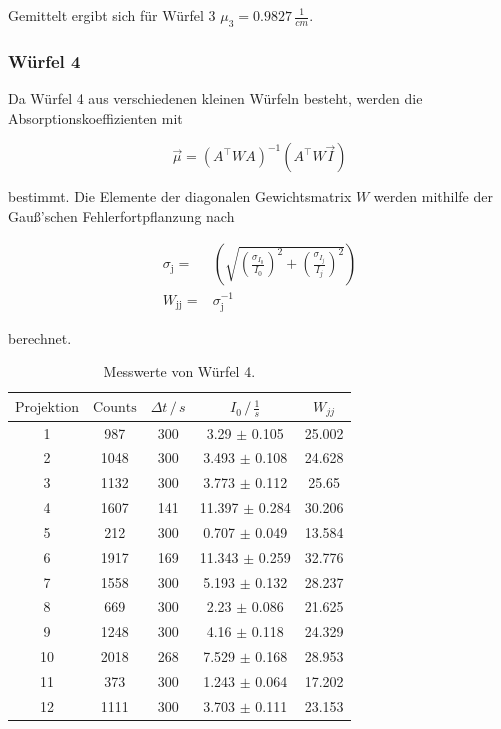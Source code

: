 \noindent
Gemittelt ergibt sich für Würfel 3 $\mu_3 = 0.9827 \, \frac{1}{cm}$.

\subsubsection{Würfel 4}




    \noindent
    Da Würfel 4 aus verschiedenen kleinen Würfeln besteht, werden die Absorptionskoeffizienten mit
  
  \begin{equation}
  \vec{\mu} = ( A^\top W A)^{-1}(A^\top W \vec{I})
  \label{eqn:mu4}
  \end{equation}
  
  \noindent
  bestimmt.
  Die Elemente der diagonalen Gewichtsmatrix $W$ werden mithilfe der Gauß'schen Fehlerfortpflanzung nach
  
    \begin{align*}
        \sigma_{\text{j}}=& \left(\sqrt{\left(\frac{\sigma_{I_0}}{I_0}\right)^2+ \left(\frac{\sigma_{I_j}}{I_j}\right)^2}\right)\\
        W_{\text{jj}}=& \sigma_{\text{j}}^{-1}
    \end{align*}
    
    \noindent
    berechnet.

    \begin{table}
      \centering
      \begin{tabular}{c c c c c}
      \toprule
      $\text{Projektion}$ & $\text{Counts}$ & $\Delta t \,/\, s $ & $I_0 \,/\, \frac{1}{s} $ & $W_{jj}$\\
       \midrule 
    1  & 987  & 300 & 3.29  $\pm$ 0.105   & 25.002 \\
    2  & 1048 & 300 &   3.493 $\pm$ 0.108 &  24.628 \\
    3  & 1132 & 300 &  3.773 $\pm$ 0.112  & 25.65 \\
    4  & 1607 & 141 &  11.397 $\pm$ 0.284 &  30.206 \\
    5  & 212  & 300 &  0.707 $\pm$ 0.049  & 13.584 \\
    6  & 1917 & 169 &  11.343 $\pm$ 0.259 &  32.776 \\
    7  & 1558 & 300 & 5.193  $\pm$ 0.132  & 28.237 \\
    8  & 669  & 300 & 2.23  $\pm$ 0.086   &  21.625\\
    9  & 1248 & 300 &   4.16 $\pm$ 0.118  &  24.329\\
    10 &  2018 & 268 & 7.529 $\pm$  0.168 & 28.953  \\
    11 &  373  & 300 & 1.243 $\pm$ 0.064  & 17.202 \\
    12 &  1111 & 300 & 3.703 $\pm$ 0.111  & 23.153 \\
      \bottomrule
      \end{tabular}
      \label{tab:w4}
      \caption{Messwerte von Würfel 4.}
      \end{table}

